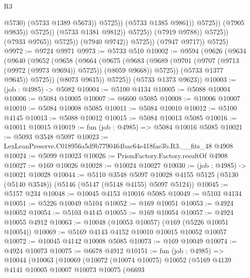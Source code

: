 \begin{lexlean}{R3}
\begin{coremodule}
                                                    @5730)
                                                  (@5733 @1389 @5673))
                                                @5725))
                                            (@5733 @1385 @9861))
                                          @5725))
                                      (@7905 @9835))
                                    @5725))
                                (@5733 @1381 @9812))
                              @5725))
                          (@7919 @9788))
                        @5725))
                    (@7933 @9765))
                  @5725))
              (@7940 @9742))
            @5725))
        (@7947 @9717))
      @5725)
@9972 := @9724 @9971
@9973 := @5733 @510
@10002 := @9594
    (@9626
      (@9634
        (@9640
          (@9652
            (@9658
              (@9664
                (@9675
                  (@9683
                    (@9689 (@9701 (@9707 (@9713 (@9972 (@9973 @9694)) @5725)) (@8059 @9668)) @5725))
                  (@5733 @1377 @9645))
                @5725))
            (@8073 @9615))
          @5725))
      (@5733 @1373 @9623))
@10003 := (job : @4985) -> @5082
@10004 := @5100 @4134
@10005 := @5088 @10004
@10006 := @5084 @10005
@10007 := @6600 @5085
@10008 := @10006 @10007
@10010 := @5084 @10008 @5085
@10011 := @5084 @10010
@10012 := @5100 @4145
@10013 := @5088 @10012
@10015 := @5084 @10013 @5085
@10016 := @10011 @10015
@10019 := fun (job : @4985) => @5084 @10016 @5085
@10021 := @5093 @3548 @5097
@10023 := LexLeanPreserve.C018956a5d9b7790464bac64e418fae3b.R3.__fits_48 @4908
@10024 := @5099 @10023
@10026 := PrismFactory.Factory.resultOf @4908
@10027 := @169 @10026
@10028 := @10024 @10027
@10030 := (job : @4985) -> @10021 @10028
@10044 := @5110
    @3548
    @5097
    @10028
    @4155
    @5125
    (@5130 (@5140 @3548))
    (@5146 (@5147 (@5148 @4155) @5097 @5124))
@10045 := @5157 @234
@10048 := @10045 @4153 @10016 @5085
@10049 := @5103 @4134
@10051 := @5226 @10049 @5104
@10052 := @169 @10051
@10053 := @4924 @10052
@10054 := @5103 @4145
@10055 := @169 @10054
@10057 := @4924 @10055 @4912
@10063 := @10048 (@10053 @10057) (@169 (@5226 @10051 @10054))
@10069 := @5169 @4143 @4152 @10010 @10015 @10052 @10057
@10072 := @10045 @4142 @10008 @5085
@10073 := @169 @10049
@10074 := @4924 @10073
@10075 := @6678 @4912
@10151 := fun (job : @4985) =>
  @10044
    (@10063
      (@10069
        (@10072
          (@10074 @10075)
          @10052
          (@5169
            @4139
            @4141
            @10005
            @10007
            @10073
            @10075
            (@6693

\end{coremodule}
\end{lexlean}
